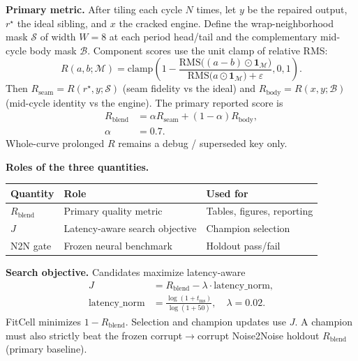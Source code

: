 \textbf{Primary metric.}
After tiling each cycle $N$ times, let $y$ be the repaired output, $r^{\star}$ the ideal sibling, and $x$ the cracked engine.
Define the wrap-neighborhood mask $\mathcal{S}$ of width $W{=}8$ at each period head/tail and the complementary mid-cycle body mask $\mathcal{B}$.
Component scores use the unit clamp of relative RMS:
\begin{equation}
\label{eq:R-component}
R(a,b;\mathcal{M})
=\mathrm{clamp}\!\left(
  1-\frac{\mathrm{RMS}\bigl((a-b)\odot\mathbf{1}_{\mathcal{M}}\bigr)}
         {\mathrm{RMS}\bigl(a\odot\mathbf{1}_{\mathcal{M}}\bigr)+\varepsilon},
  0,1\right).
\end{equation}
Then $R_{\mathrm{seam}}=R(r^{\star},y;\mathcal{S})$ (seam fidelity vs the ideal) and
$R_{\mathrm{body}}=R(x,y;\mathcal{B})$ (mid-cycle identity vs the engine).
The primary reported score is
\begin{equation}
\label{eq:R-blend}
\begin{aligned}
R_{\mathrm{blend}}
&=\alpha R_{\mathrm{seam}}+(1-\alpha)R_{\mathrm{body}},\\
\alpha&=0.7.
\end{aligned}
\end{equation}
Whole-curve prolonged $R$ remains a debug / superseded key only.

\textbf{Roles of the three quantities.}
\begin{center}
\small
\begin{tabular}{@{}lll@{}}
\toprule
Quantity & Role & Used for \\
\midrule
$R_{\mathrm{blend}}$ & Primary quality metric & Tables, figures, reporting \\
$J$ & Latency-aware search objective & Champion selection \\
N2N gate & Frozen neural benchmark & Holdout pass/fail \\
\bottomrule
\end{tabular}
\end{center}

\textbf{Search objective.}
Candidates maximize latency-aware
\begin{equation}
\label{eq:outer-obj}
\begin{aligned}
J&=R_{\mathrm{blend}}-\lambda\cdot\mathrm{latency\_norm},\\
\mathrm{latency\_norm}
&=\frac{\log(1+t_{\mathrm{ms}})}{\log(1+50)},
\quad \lambda=0.02.
\end{aligned}
\end{equation}
FitCell minimizes $1-R_{\mathrm{blend}}$. Selection and champion updates use $J$.
A champion must also strictly beat the frozen corrupt$\to$corrupt Noise2Noise holdout $R_{\mathrm{blend}}$ (primary baseline).

